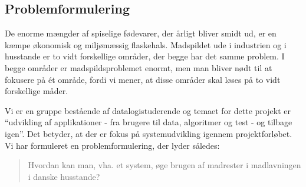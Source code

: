 \subsection{Problemformulering}
\label{subsec:problemformulering}

De enorme mængder af spiselige fødevarer, der årligt bliver smidt ud, er en kæmpe økonomisk og miljømæssig flaskehals. Madspildet ude i industrien og i husstande er to vidt forskellige områder, der begge har det samme problem. I begge områder er madspildsproblemet enormt, men man bliver nødt til at fokusere på ét område, fordi vi mener, at disse områder skal løses på to vidt forskellige måder.

Vi er en gruppe bestående af datalogistuderende og temaet for dette projekt er ``udvikling af applikationer - fra brugere til data, algoritmer og test - og tilbage igen''. Det betyder, at der er fokus på systemudvikling igennem projektforløbet. Vi har formuleret en problemformulering, der lyder således:

\begin{quote}
Hvordan kan man, vha. et system, øge brugen af madrester i madlavningen i danske husstande?
\end{quote} 
